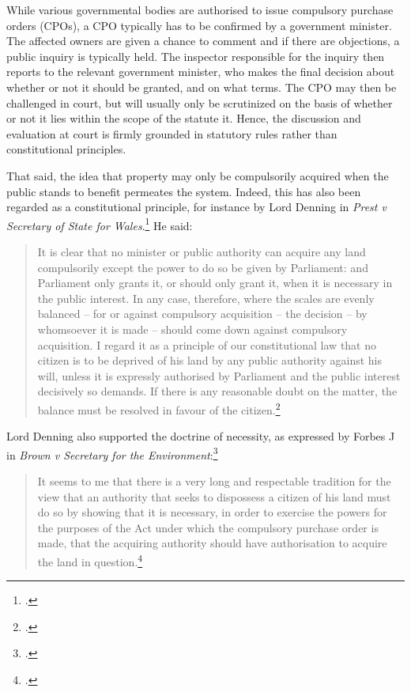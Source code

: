 While various governmental bodies are authorised to issue compulsory purchase orders (CPOs), a CPO typically has to be confirmed by a government minister. The affected owners are given a chance to comment and if there are objections, a public inquiry is typically held. The inspector responsible for the inquiry then reports to the relevant government minister, who makes the final decision about whether or not it should be granted, and on what terms. The CPO may then be challenged in court, but will usually only be scrutinized on the basis of whether or not it lies within the scope of the statute  it. Hence, the discussion and evaluation at court is firmly grounded in statutory rules rather than constitutional principles.

That said, the idea that property may only be compulsorily acquired when the public stands to benefit permeates the system. Indeed, this has also been regarded as a constitutional principle, for instance by Lord Denning in {\it Prest v Secretary of State for Wales}.\footcite{prest82} He said:

\begin{quote}
It is clear that no minister or public authority can acquire any land compulsorily except the power to do so be given by Parliament: and Parliament only grants it, or should only grant it, when it is necessary in the public interest. In any case, therefore, where the scales are evenly balanced – for or against compulsory acquisition – the decision – by whomsoever it is made – should come down against compulsory acquisition. I regard it as a principle of our constitutional law that no citizen is to be deprived of his land by any public authority against his will, unless it is expressly authorised by Parliament and the public interest decisively so demands. If there is any reasonable doubt on the matter, the balance must be resolved in favour of the citizen.\footcite[198]{prest82}
\end{quote}

Lord Denning also supported the doctrine of necessity, as expressed by Forbes J in {\it Brown v Secretary for the Environment}:\footcite{brown78}

\begin{quote}It seems to me that there is a very long and respectable tradition for the view that an authority that seeks to dispossess a citizen of his land must do so by showing that it is necessary, in order to exercise the powers for the purposes of the Act under which the compulsory purchase order is made, that the acquiring authority should have authorisation to acquire the land in question.\footcite[291]{brown78}
\end{quote}

